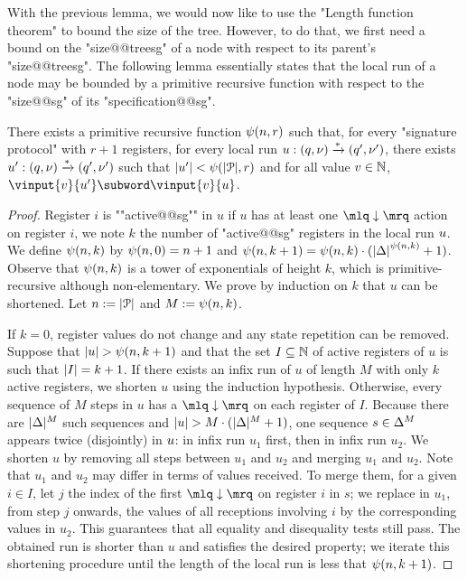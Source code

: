 With the previous lemma, we would now like to use the "Length function theorem" to bound the size of the tree. However, to do that, we first need a bound on the "size@@treesg" of a node with respect to its parent's "size@@treesg". The following lemma essentially states that the local run of a node may be bounded by a primitive recursive function with respect to the "size@@sg" of its "specification@@sg".

\begin{lemma}
\label{lem:towerbound_signature}
There exists a primitive recursive function $\psi(n,r)$ such that, for every "signature protocol" with $r+1$ registers, for every local run $u: (q,\nu) \xrightarrow{*} (q', \nu')$, there exists $u' : (q,\nu) \xrightarrow{*} (q',\nu')$ such that $|u'| < \psi(|\mathcal{P}|,r)$ and for all value $v \in \mathbb{N}$,  $\vinput{v}{u'} \subword \vinput{v}{u}$. 
\end{lemma}
\begin{proof}
Register $i$ is ""active@@sg"" in $u$ if $u$ has at least one $\quotemarks{\enregact}$ action on register $i$, we note $k$ the number of "active@@sg" registers in the local run $u$. We define $\psi(n,k)$ by $\psi(n,0) = n+1$ and $\psi(n,k+1) = \psi(n,k) \cdot ({|\Delta|}^{\psi(n,k)}+1)$. Observe that $\psi(n,k)$ is a tower of exponentials of height $k$, which is primitive-recursive although non-elementary.
We prove by induction on $k$ that $u$ can be shortened. Let $n := |\mathcal{P}|$ and $M := \psi(n,k)$.
 

If $k=0$, register values do not change and any state repetition can be removed. Suppose that $|u| > \psi(n,k+1)$ and that the set $I \subseteq \mathbb{N}$ of active registers of $u$ is such that $|I| = k+1$. If there exists an infix run of $u$ of length $M$ with only $k$ active registers, we shorten $u$ using the induction hypothesis. Otherwise, every sequence of $M$ steps in $u$ has a $\quotemarks{\enregact}$ on each register of $I$. Because there are $|\Delta|^M$ such sequences and $|u| > M \cdot (|\Delta|^M +1)$, one sequence $s \in \Delta^M$ appears twice (disjointly) in $u$: in infix run $u_1$ first, then in infix run $u_2$. We shorten $u$ by removing all steps between $u_1$ and $u_2$ and merging $u_1$ and $u_2$. Note that $u_1$ and $u_2$ may differ in terms of values received. To merge them, for a given $i \in I$, let $j$ the index of the first $\quotemarks{\enregact}$ on register $i$ in $s$; we replace in $u_1$, from step $j$ onwards, the values of all receptions involving $i$ by the corresponding values in $u_2$. This guarantees that all equality and disequality tests still pass. The obtained run is shorter than $u$ and satisfies the desired property; we iterate this shortening procedure until the length of the local run is less that $\psi(n,k+1)$.
\end{proof}

